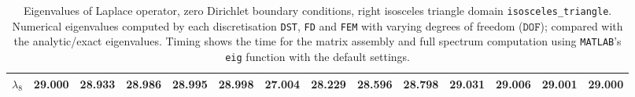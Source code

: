 \begin{table}[htbp]
{{\begin{tabular}{lrrrrrrrrrrrrr}
    $\lambda_{8}$ & \textbf{29.000} & 28.933 & 28.986 & 28.995 & 28.998 & 27.004 & 28.229 & 28.596 & 28.798 & 29.031 & 29.006 & 29.001 & 29.000 \\
    \bottomrule
  \end{tabular}}}
  \caption{Eigenvalues of Laplace operator, zero Dirichlet boundary conditions, right isosceles triangle domain \texttt{isosceles\_triangle}. Numerical eigenvalues computed by each discretisation \texttt{DST}, \texttt{FD} and \texttt{FEM} with varying degrees of freedom ($\mathtt{DOF}$); compared with the analytic/exact eigenvalues. Timing shows the time for the matrix assembly and full spectrum computation using \texttt{MATLAB}'s \lstinline{eig} function with the default settings.}
  \label{tab:eigenvalues_head_isosceles_triangle_transposed}
\end{table}
